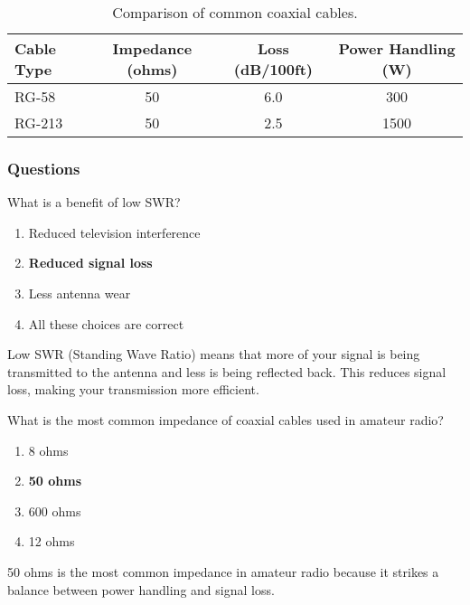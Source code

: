\begin{table}[h!]
    \centering
    \begin{tabular}{|l|c|c|c|}
        \hline
        \textbf{Cable Type} & \textbf{Impedance (ohms)} & \textbf{Loss (dB/100ft)} & \textbf{Power Handling (W)} \\
        \hline
        RG-58 & 50 & 6.0 & 300 \\
        RG-213 & 50 & 2.5 & 1500 \\
        \hline
    \end{tabular}
    \caption{Comparison of common coaxial cables.}
    \label{tab:coax-comparison}
\end{table}

\subsubsection{Questions}

\begin{tcolorbox}[colback=gray!10!white,colframe=black!75!black,title={T9B01}]
What is a benefit of low SWR?
\begin{enumerate}[label=\Alph*),noitemsep]
    \item Reduced television interference
    \item \textbf{Reduced signal loss}
    \item Less antenna wear
    \item All these choices are correct
\end{enumerate}
\end{tcolorbox}
Low SWR (Standing Wave Ratio) means that more of your signal is being transmitted to the antenna and less is being reflected back. This reduces signal loss, making your transmission more efficient.

\begin{tcolorbox}[colback=gray!10!white,colframe=black!75!black,title={T9B02}]
What is the most common impedance of coaxial cables used in amateur radio?
\begin{enumerate}[label=\Alph*),noitemsep]
    \item 8 ohms
    \item \textbf{50 ohms}
    \item 600 ohms
    \item 12 ohms
\end{enumerate}
\end{tcolorbox}
50 ohms is the most common impedance in amateur radio because it strikes a balance between power handling and signal loss.

